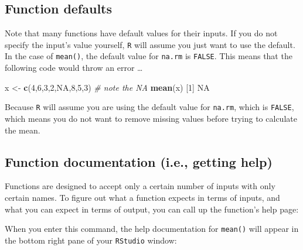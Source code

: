 \documentclass[
]{book}
\newenvironment{Shaded}{\begin{snugshade}}{\end{snugshade}}
\newcommand{\CommentTok}[1]{\textcolor[rgb]{0.56,0.35,0.01}{\textit{#1}}}
\newcommand{\DecValTok}[1]{\textcolor[rgb]{0.00,0.00,0.81}{#1}}
\newcommand{\KeywordTok}[1]{\textcolor[rgb]{0.13,0.29,0.53}{\textbf{#1}}}
\newcommand{\NormalTok}[1]{#1}
\newcommand{\OtherTok}[1]{\textcolor[rgb]{0.56,0.35,0.01}{#1}}
\newcommand{\StringTok}[1]{\textcolor[rgb]{0.31,0.60,0.02}{#1}}
\begin{document}
\hypertarget{function-defaults}{%
\subsection*{Function defaults}\label{function-defaults}}

Note that many functions have default values for their inputs. If you do not specify the input's value yourself, \texttt{R} will assume you just want to use the default. In the case of \texttt{mean()}, the default value for \texttt{na.rm} is \texttt{FALSE}. This means that the following code would throw an error \ldots{}

\begin{Shaded}
\begin{Highlighting}[]
\NormalTok{x <-}\StringTok{ }\KeywordTok{c}\NormalTok{(}\DecValTok{4}\NormalTok{,}\DecValTok{6}\NormalTok{,}\DecValTok{3}\NormalTok{,}\DecValTok{2}\NormalTok{,}\OtherTok{NA}\NormalTok{,}\DecValTok{8}\NormalTok{,}\DecValTok{5}\NormalTok{,}\DecValTok{3}\NormalTok{)  }\CommentTok{# note the NA}
\KeywordTok{mean}\NormalTok{(x)}
\NormalTok{[}\DecValTok{1}\NormalTok{] }\OtherTok{NA}
\end{Highlighting}
\end{Shaded}

Because \texttt{R} will assume you are using the default value for \texttt{na.rm}, which is \texttt{FALSE}, which means you do not want to remove missing values before trying to calculate the mean.

\hypertarget{function-documentation-i.e.-getting-help}{%
\subsection*{Function documentation (i.e., getting help)}\label{function-documentation-i.e.-getting-help}}

Functions are designed to accept only a certain number of inputs with only certain names. To figure out what a function expects in terms of inputs, and what you can expect in terms of output, you can call up the function's help page:

When you enter this command, the help documentation for \texttt{mean()} will appear in the bottom right pane of your \texttt{RStudio} window:
\end{document}
